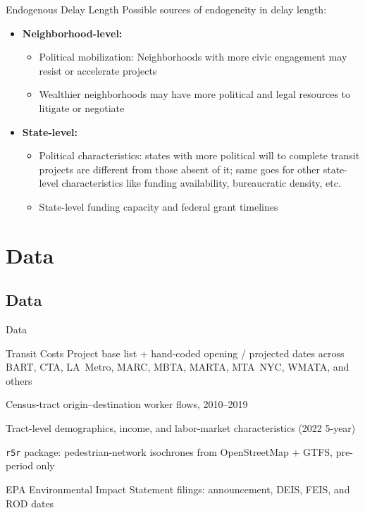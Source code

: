 \begin{frame}[label=endogenous2]{Endogenous Delay Length}
Possible sources of endogeneity in delay length:
\begin{itemize}
  \item \textbf{Neighborhood-level:}
  \begin{itemize}
      \item Political mobilization: Neighborhoods with more civic engagement may resist or accelerate projects
      \item Wealthier neighborhoods may have more political and legal resources to litigate or negotiate
  \end{itemize}
  \item \textbf{State-level:}
  \begin{itemize}
      \item Political characteristics: states with more political will to complete transit projects are different from those absent of it; same goes for other state-level characteristics like funding availability, bureaucratic density, etc.
      \item State-level funding capacity and federal grant timelines
  \end{itemize}
\end{itemize}
\end{frame}
\section{Data}
\subsection{Data}
\begin{frame}[label=data]{Data}
\small
\begin{description}[labelwidth=3.2cm,leftmargin=!]
  \item[Station dataset]
    Transit Costs Project base list + hand-coded opening / projected dates
    across BART, CTA, LA~Metro, MARC, MBTA, MARTA, MTA~NYC, WMATA, and others
  \item[LODES]
    Census-tract origin--destination worker flows, 2010--2019
  \item[ACS]
    Tract-level demographics, income, and labor-market characteristics
    (2022 5-year)
  \item[Walking times]
    \texttt{r5r} package: pedestrian-network isochrones from
    OpenStreetMap + GTFS, pre-period only \parencite{r5r}
  \item[EIS records]
    EPA Environmental Impact Statement filings: announcement, DEIS, FEIS,
    and ROD dates
\end{description}
\end{frame}
